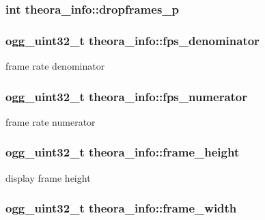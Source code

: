 \subsubsection[{dropframes\_\-p}]{\setlength{\rightskip}{0pt plus 5cm}int {\bf theora\_\-info::dropframes\_\-p}}\label{structtheora__info_af294db65a8363a0bcf43f4727763b291}
\subsubsection[{fps\_\-denominator}]{\setlength{\rightskip}{0pt plus 5cm}ogg\_\-uint32\_\-t {\bf theora\_\-info::fps\_\-denominator}}\label{structtheora__info_a9aa7e826e0323a4ae8cd8646a6cfbfea}


frame rate denominator 

\subsubsection[{fps\_\-numerator}]{\setlength{\rightskip}{0pt plus 5cm}ogg\_\-uint32\_\-t {\bf theora\_\-info::fps\_\-numerator}}\label{structtheora__info_a3478199aa5ab213816c1819f70085ad7}


frame rate numerator 

\subsubsection[{frame\_\-height}]{\setlength{\rightskip}{0pt plus 5cm}ogg\_\-uint32\_\-t {\bf theora\_\-info::frame\_\-height}}\label{structtheora__info_a287e4c194f1d2e6deb39d59f1748ea48}


display frame height 

\subsubsection[{frame\_\-width}]{\setlength{\rightskip}{0pt plus 5cm}ogg\_\-uint32\_\-t {\bf theora\_\-info::frame\_\-width}}\label{structtheora__info_a8f28f4018a25634d40e4ae861fbbccfa}


